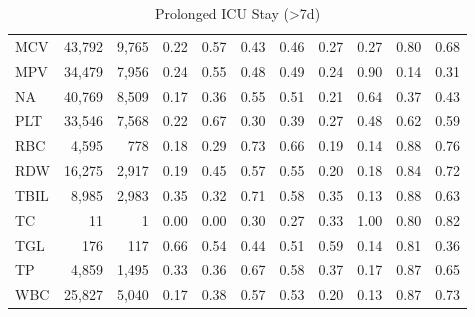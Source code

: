 \begin{table}[ht]
\begin{tabular}{lrrrrrrrrrr}
MCV & 43,792 & 9,765 & 0.22 & 0.57 & 0.43 & 0.46 & 0.27 & 0.27 & 0.80 & 0.68 \\
MPV & 34,479 & 7,956 & 0.24 & 0.55 & 0.48 & 0.49 & 0.24 & 0.90 & 0.14 & 0.31 \\
NA & 40,769 & 8,509 & 0.17 & 0.36 & 0.55 & 0.51 & 0.21 & 0.64 & 0.37 & 0.43 \\
PLT & 33,546 & 7,568 & 0.22 & 0.67 & 0.30 & 0.39 & 0.27 & 0.48 & 0.62 & 0.59 \\
RBC & 4,595 & 778 & 0.18 & 0.29 & 0.73 & 0.66 & 0.19 & 0.14 & 0.88 & 0.76 \\
RDW & 16,275 & 2,917 & 0.19 & 0.45 & 0.57 & 0.55 & 0.20 & 0.18 & 0.84 & 0.72 \\
TBIL & 8,985 & 2,983 & 0.35 & 0.32 & 0.71 & 0.58 & 0.35 & 0.13 & 0.88 & 0.63 \\
TC & 11 & 1 & 0.00 & 0.00 & 0.30 & 0.27 & 0.33 & 1.00 & 0.80 & 0.82 \\
TGL & 176 & 117 & 0.66 & 0.54 & 0.44 & 0.51 & 0.59 & 0.14 & 0.81 & 0.36 \\
TP & 4,859 & 1,495 & 0.33 & 0.36 & 0.67 & 0.58 & 0.37 & 0.17 & 0.87 & 0.65 \\
WBC & 25,827 & 5,040 & 0.17 & 0.38 & 0.57 & 0.53 & 0.20 & 0.13 & 0.87 & 0.73 \\
\bottomrule
\end{tabular}
\caption{Prolonged ICU Stay (>7d)}
\end{table}